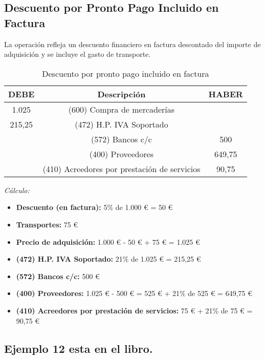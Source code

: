 \documentclass{article}
\begin{document}
\subsection*{Descuento por Pronto Pago Incluido en Factura}
La operación refleja un descuento financiero en factura descontado del importe de adquisición y se incluye el gasto de transporte.

\begin{table}[H]
\centering
\begin{tabular}{|c|c|c|}
\hline
\textbf{DEBE} & \textbf{Descripción} & \textbf{HABER} \\
\hline
1.025 & (600) Compra de mercaderías & \\
215,25 & (472) H.P. IVA Soportado & \\
 & (572) Bancos c/c & 500 \\
 & (400) Proveedores & 649,75 \\
 & (410) Acreedores por prestación de servicios & 90,75 \\
\hline
\end{tabular}
\caption{Descuento por pronto pago incluido en factura}
\end{table}

\textit{Cálculo:}
\begin{itemize}
    \item \textbf{Descuento (en factura):} 5\% de 1.000 € = 50 €
    \item \textbf{Transportes:} 75 €
    \item \textbf{Precio de adquisición:} 1.000 € - 50 € + 75 € = 1.025 €
    \item \textbf{(472) H.P. IVA Soportado:} 21\% de 1.025 € = 215,25 €
    \item \textbf{(572) Bancos c/c:} 500 €
    \item \textbf{(400) Proveedores:} 1.025 € - 500 € = 525 € + 21\% de 525 € = 649,75 €
    \item \textbf{(410) Acreedores por prestación de servicios:} 75 € + 21\% de 75 € = 90,75 €
\end{itemize}

\begin{tcolorbox}[colback=blue!5!white, colframe=blue!75!black, title=Plus]
\subsection*{Ejemplo 12 esta en el libro.}
\end{tcolorbox}

\end{document}
